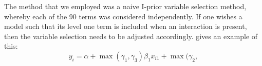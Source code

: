 \begin{remark}
	The method that we employed was a naive I-prior variable selection method, whereby each of the 90 terms was considered independently. If one wishes a model such that its level one term is included when an interaction is present, then the variable selection needs to be adjusted accordingly. \cite{Kuo1998} gives an example of this:
\[
y_i = \alpha + \max(\gamma_1, \gamma_3)\beta_1x_{i1} + \max(\gamma_2, 
\]
\end{remark}
